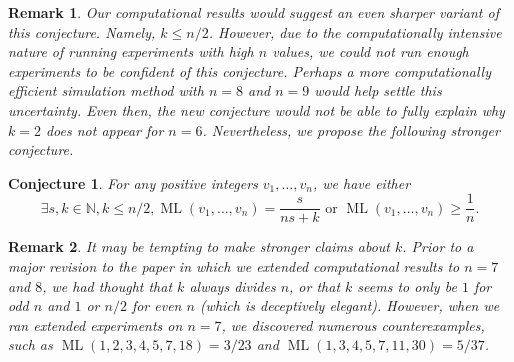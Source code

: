 \documentclass[11pt]{amsart}
\newtheorem{conj}{Conjecture}[section]
\newtheorem{remark}{Remark}[section]
\DeclareMathOperator{\ML}{ML}
\begin{document}
\begin{remark}
    Our computational results would suggest an even sharper variant of this conjecture. Namely, $k \leq n/2$. However, due to the computationally intensive nature of running experiments with high $n$ values, we could not run enough experiments to be confident of this conjecture. Perhaps a more computationally efficient simulation method with $n = 8$ and $n = 9$ would help settle this uncertainty. Even then, the new conjecture would not be able to fully explain why $k=2$ does not appear for $n=6$. Nevertheless, we propose the following stronger conjecture.
\end{remark}

\begin{conj}
    \label{con4}
    For any positive integers $v_1,\ldots,v_n$, we have either
    $$\exists s,k \in \mathbb{N},k \leq n/2,  \ML(v_1,\ldots,v_n) = \frac{s}{ns + k} \text{ or } \ML(v_1,\ldots,v_n) \geq \frac{1}{n}.$$
\end{conj}

\begin{remark}
    It may be tempting to make stronger claims about $k$. Prior to a major revision to the paper in which we extended computational results to $n = 7$ and $8$, we had thought that $k$ always divides $n$, or that $k$ seems to only be $1$ for odd $n$ and $1$ or $n/2$ for even $n$ (which is deceptively elegant). However, when we ran extended experiments on $n = 7$, we discovered numerous counterexamples, such as $\ML(1,2,3,4,5,7,18) = 3/23$ and $\ML(1,3,4,5,7,11,30) = 5/37$.
\end{remark}


\end{document}
